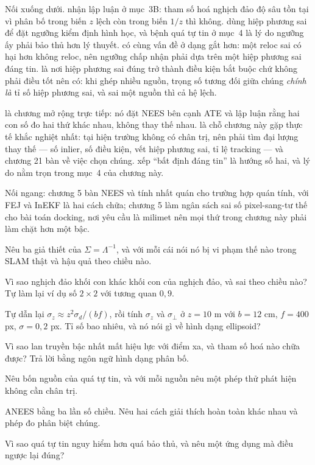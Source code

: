 \documentclass[../../vslam.tex]{subfiles}
\begin{document}
Nối xuống dưới.  nhận lập luận ở mục~3B: tham số hoá nghịch đảo độ sâu tồn tại vì phân bố trong biến \(z\) lệch còn trong biến \(1/z\) thì không.  dùng hiệp phương sai để đặt ngưỡng kiểm định hình học, và bệnh quá tự tin ở mục~4 là lý do ngưỡng ấy phải bảo thủ hơn lý thuyết.  có cùng vấn đề ở dạng gắt hơn: một reloc sai có hại hơn không reloc, nên ngưỡng chấp nhận phải dựa trên một hiệp phương sai đáng tin.  là nơi hiệp phương sai đúng trở thành điều kiện bắt buộc chứ không phải điều tốt nên có: khi ghép nhiều nguồn, trọng số tương đối giữa chúng \emph{chính là} tỉ số hiệp phương sai, và sai một nguồn thì cả hệ lệch.

 là chương mở rộng trực tiếp: nó đặt NEES bên cạnh ATE và lập luận rằng hai con số đo hai thứ khác nhau, không thay thế nhau.  là chỗ chương này gặp thực tế khắc nghiệt nhất: tại hiện trường không có chân trị, nên phải tìm đại lượng thay thế --- số inlier, số điều kiện, vết hiệp phương sai, tỉ lệ tracking --- và chương 21 bàn về việc chọn chúng.  xếp ``bất định đáng tin'' là hướng số hai, và lý do nằm trọn trong mục~4 của chương này.

Nối ngang:  chương 5 bàn NEES và tính nhất quán cho trường hợp quán tính, với FEJ và InEKF là hai cách chữa;  chương 5 làm ngân sách sai số pixel-sang-tư thế cho bài toán docking, nơi yêu cầu là milimet nên mọi thứ trong chương này phải làm chặt hơn một bậc.

\begin{tukiem}
\item Nêu ba giả thiết của \(\Sigma = \Lambda^{-1}\), và với mỗi cái nói nó bị vi phạm thế nào trong SLAM thật và hậu quả theo chiều nào.
\item Vì sao nghịch đảo khối con khác khối con của nghịch đảo, và sai theo chiều nào? Tự làm lại ví dụ số \(2\times2\) với tương quan \(0{,}9\).
\item Tự dẫn lại \(\sigma_z \approx z^2\sigma_d/(bf)\), rồi tính \(\sigma_z\) và \(\sigma_\perp\) ở \(z = 10\) m với \(b=12\) cm, \(f=400\) px, \(\sigma = 0{,}2\) px. Tỉ số bao nhiêu, và nó nói gì về hình dạng ellipsoid?
\item Vì sao lan truyền bậc nhất mất hiệu lực với điểm xa, và tham số hoá nào chữa được? Trả lời bằng ngôn ngữ hình dạng phân bố.
\item Nêu bốn nguồn của quá tự tin, và với mỗi nguồn nêu một phép thử phát hiện không cần chân trị.
\item ANEES bằng ba lần số chiều. Nêu hai cách giải thích hoàn toàn khác nhau và phép đo phân biệt chúng.
\item Vì sao quá tự tin nguy hiểm hơn quá bảo thủ, và nêu một ứng dụng mà điều ngược lại đúng?
\end{tukiem}
\ifSubfilesClassLoaded{\printbibliography[title={Nguồn}]}{}
\end{document}
